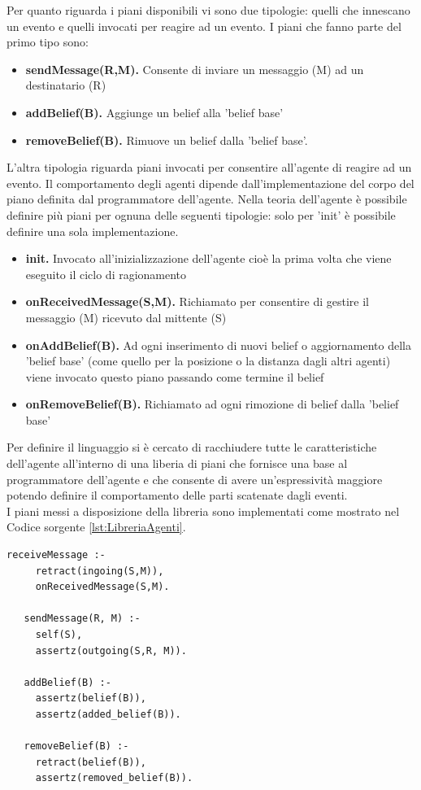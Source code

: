 \documentclass[12pt,a4paper,openright,twoside]{report}
\begin{document}
Per quanto riguarda i piani disponibili vi sono due tipologie: quelli che innescano un evento e quelli invocati per reagire ad un evento.
I piani che fanno parte del primo tipo sono:
\begin{itemize}
   \item \textbf{sendMessage(R,M).} Consente di inviare un messaggio (M) ad un destinatario (R)
   \item \textbf{addBelief(B).} Aggiunge un belief alla 'belief base'
   \item \textbf{removeBelief(B).} Rimuove un belief dalla 'belief base'.
\end{itemize}
L'altra tipologia riguarda piani invocati per consentire all'agente di reagire ad un evento. Il comportamento degli agenti dipende dall'implementazione del corpo del piano definita dal programmatore dell'agente. Nella teoria dell'agente \`e possibile definire pi\`u piani per ognuna delle seguenti tipologie: solo per 'init' \`e possibile definire una sola implementazione.
\begin{itemize}
   \item \textbf{init.} Invocato all'inizializzazione dell'agente cio\`e la prima volta che viene eseguito il ciclo di ragionamento
   \item \textbf{onReceivedMessage(S,M).} Richiamato per consentire di gestire il messaggio (M) ricevuto dal mittente (S)
   \item \textbf{onAddBelief(B).} Ad ogni inserimento di nuovi belief o aggiornamento della 'belief base' (come quello per la posizione o la distanza dagli altri agenti) viene invocato questo piano passando come termine il belief
   \item \textbf{onRemoveBelief(B).} Richiamato ad ogni rimozione di belief dalla 'belief base'
\end{itemize}

Per definire il linguaggio si \`e cercato di racchiudere tutte le caratteristiche dell'agente all'interno di una liberia di piani che fornisce una base al programmatore dell'agente e che consente di avere un'espressivit\`a maggiore potendo definire il comportamento delle parti scatenate dagli eventi.
\\
I piani messi a disposizione della libreria sono implementati come mostrato nel Codice sorgente \ref{lst:LibreriaAgenti}.
\medskip
\begin{lstlisting}[firstnumber=1,label={lst:LibreriaAgenti},caption={Libreria agenti}]
   receiveMessage :-
     retract(ingoing(S,M)),
     onReceivedMessage(S,M).

   sendMessage(R, M) :-
     self(S),
     assertz(outgoing(S,R, M)).

   addBelief(B) :-
     assertz(belief(B)),
     assertz(added_belief(B)).

   removeBelief(B) :-
     retract(belief(B)),
     assertz(removed_belief(B)).
\end{lstlisting}
\end{document}

